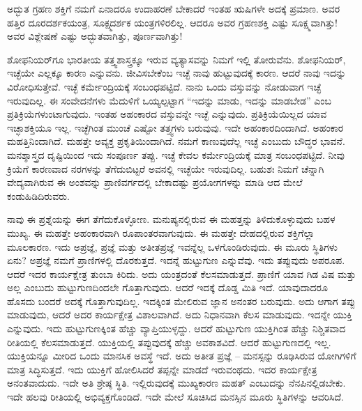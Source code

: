 ಅದ್ಭುತ ಗ್ರಹಣ ಶಕ್ತಿಗೆ ನಮಗೆ ಏನಾದರೂ ಉದಾಹರಣೆ ಬೇಕಾದರೆ ಇಂತಹ ಋಷಿಗಳೇ ಅದಕ್ಕೆ ಪ್ರಮಾಣ. ಅವರ ಹತ್ತಿರ ದೂರದರ್ಶಕಯಂತ್ರ, ಸೂಕ್ಷ್ಮದರ್ಶಕ ಯಂತ್ರಗಳಿರಲಿಲ್ಲ. ಆದರೂ ಅವರ ಗ್ರಹಣಶಕ್ತಿ ಎಷ್ಟು ಸೂಕ್ಷ್ಮವಾಗಿತ್ತು! ಅವರ ವಿಶ್ಲೇಷಣೆ ಎಷ್ಟು ಅದ್ಭುತವಾಗಿತ್ತು, ಪೂರ್ಣವಾಗಿತ್ತು!

ಶೋಫನಿಯರ್‌ಗೂ ಭಾರತೀಯ ತತ್ತ್ವಶಾಸ್ತ್ರಕ್ಕೂ ಇರುವ ವ್ಯತ್ಯಾಸವನ್ನು ನಿಮಗೆ ಇಲ್ಲಿ ತೋರುವೆನು. ಶೋಫನಿಯರ್, ಇಚ್ಛೆಯೇ ಎಲ್ಲಕ್ಕೂ ಕಾರಣ ಎನ್ನುವನು. ಜೀವಿಸಬೇಕೆಂಬ ಇಚ್ಛೆ ನಾವು ಹುಟ್ಟುವುದಕ್ಕೆ ಕಾರಣ. ಆದರೆ ನಾವು ಇದನ್ನು ವಿರೋಧಿಸುತ್ತೇವೆ. ಇಚ್ಛೆ ಕರ್ಮೇಂದ್ರಿಯಕ್ಕೆ ಸಂಬಂಧಪಟ್ಟಿದೆ. ನಾನು ಒಂದು ವಸ್ತುವನ್ನು ನೋಡುವಾಗ ಇಚ್ಛೆ ಇರುವುದಿಲ್ಲ. ಈ ಸಂವೇದನೆಗಳು ಮೆದುಳಿಗೆ ಒಯ್ಯಲ್ಪಟ್ಟಾಗ “ಇದನ್ನು ಮಾಡು, ಇದನ್ನು ಮಾಡಬೇಡ” ಎಂಬ ಪ್ರತಿಕ್ರಿಯೆಗಳುಂಟಾಗುವುದು. ಇಂತಹ ಅಹಂಕಾರದ ವಸ್ತುವನ್ನೇ ಇಚ್ಛೆ ಎನ್ನುವುದು. ಪ್ರತಿಕ್ರಿಯೆಯಿಲ್ಲದ ಯಾವ ಇಚ್ಛಾಶಕ್ತಿಯೂ ಇಲ್ಲ. ಇಚ್ಛೆಗಿಂತ ಮುಂಚೆ ಎಷ್ಟೋ ತತ್ತ್ವಗಳು ಬರುವುವು. ಇದೇ ಅಹಂಕಾರದಿಂದಾಗಿದೆ. ಅಹಂಕಾರ ಮಹತ್ತಿನಿಂದಾಗಿದೆ. ಮಹತ್ತೇ ಅವ್ಯಕ್ತ ಪ್ರಕೃತಿಯಿಂದಾಗಿದೆ. ನಮಗೆ ಕಾಣುವುದೆಲ್ಲ ಇಚ್ಛೆ ಎಂಬುದು ಬೌದ್ಧರ ಭಾವನೆ. ಮನಶ್ಶಾಸ್ತ್ರದ ದೃಷ್ಟಿಯಿಂದ ಇದು ಸಂಪೂರ್ಣ ತಪ್ಪು. ಇಚ್ಛೆ ಕೇವಲ ಕರ್ಮೇಂದ್ರಿಯಕ್ಕೆ ಮಾತ್ರ ಸಂಬಂಧಪಟ್ಟಿದೆ. ನೀವು ಕ್ರಿಯೆಗೆ ಕಾರಣವಾದ ನರಗಳನ್ನು ತೆಗೆದುಬಿಟ್ಟರೆ ಅವನಲ್ಲಿ ಇಚ್ಛೆಯೇ ಇರುವುದಿಲ್ಲ. ಬಹುಶಃ ನಿಮಗೆ ಚೆನ್ನಾಗಿ ವೇದ್ಯವಾಗಿರುವ ಈ ಅಂಶವನ್ನು ಪ್ರಾಣಿವರ್ಗದಲ್ಲಿ ಬೇಕಾದಷ್ಟು ಪ್ರಯೋಗಗಳನ್ನು ಮಾಡಿ ಆದ ಮೇಲೆ ಕಂಡುಹಿಡಿದಿರುವರು.

ನಾವು ಈ ಪ್ರಶ್ನೆಯನ್ನು ಈಗ ತೆಗೆದುಕೊಳ್ಳೋಣ. ಮನುಷ್ಯನಲ್ಲಿರುವ ಈ ಮಹತ್ತನ್ನು ತಿಳಿದುಕೊಳ್ಳುವುದು ಬಹಳ ಮುಖ್ಯ. ಈ ಮಹತ್ತೇ ಅಹಂಕಾರವಾಗಿ ರೂಪಾಂತರವಾಗುವುದು. ಈ ಮಹತ್ತೇ ದೇಹದಲ್ಲಿರುವ ಶಕ್ತಿಗೆಲ್ಲಾ ಮೂಲಕಾರಣ. ಇದು ಅಪ್ರಜ್ಞೆ, ಪ್ರಜ್ಞೆ ಮತ್ತು ಅತೀತಪ್ರಜ್ಞೆ ಇವನ್ನೆಲ್ಲ ಒಳಗೊಂಡಿರುವುದು. ಈ ಮೂರು ಸ್ಥಿತಿಗಳು ಏನು? ಅಪ್ರಜ್ಞೆ ನಮಗೆ ಪ್ರಾಣಿಗಳಲ್ಲಿ ದೊರಕುತ್ತದೆ. ಇದನ್ನೆ ಹುಟ್ಟುಗುಣ ಎನ್ನುವೆವು. ಇದು ತಪ್ಪುವುದು ಅಪರೂಪ. ಆದರೆ ಇದರ ಕಾರ್ಯಕ್ಷೇತ್ರ ತುಂಬಾ ಕಿರಿದು. ಅದು ಯಂತ್ರದಂತೆ ಕೆಲಸಮಾಡುತ್ತದೆ. ಪ್ರಾಣಿಗೆ ಯಾವ ಗಿಡ ವಿಷ ಮತ್ತು ಅಲ್ಲ ಎಂಬುದು ಹುಟ್ಟುಗುಣದಿಂದಲೇ ಗೊತ್ತಾಗುವುದು. ಆದರೆ ಇದಕ್ಕೆ ದೊಡ್ಡ ಮಿತಿ ಇದೆ. ಯಾವುದಾದರೂ ಹೊಸದು ಬಂದರೆ ಅದಕ್ಕೆ ಗೊತ್ತಾಗುವುದಿಲ್ಲ. ಇದಕ್ಕಿಂತ ಮೇಲಿರುವ ಜ್ಞಾನ ಅನಂತರ ಬರುವುದು. ಅದು ಆಗಾಗ ತಪ್ಪು ಮಾಡುವುದು, ಆದರೆ ಅದರ ಕಾರ್ಯಕ್ಷೇತ್ರ ವಿಶಾಲವಾಗಿದೆ. ಅದು ನಿಧಾನವಾಗಿ ಕೆಲಸ ಮಾಡುವುದು. ಇದನ್ನೇ ಯುಕ್ತಿ ಎನ್ನುವುದು. ಇದು ಹುಟ್ಟುಗುಣಕ್ಕಿಂತ ಹೆಚ್ಚು ವ್ಯಾಪ್ತಿಯುಳ್ಳದ್ದು. ಆದರೆ ಹುಟ್ಟುಗುಣ ಯುಕ್ತಿಗಿಂತ ಹೆಚ್ಚು ನಿಶ್ಚಿತವಾದ ರೀತಿಯಲ್ಲಿ ಕೆಲಸಮಾಡುತ್ತದೆ. ಯುಕ್ತಿಯಲ್ಲಿ ತಪ್ಪುವುದಕ್ಕೆ ಹೆಚ್ಚು ಅವಕಾಶವಿದೆ. ಆದರೆ ಹುಟ್ಟುಗುಣದಲ್ಲಿ ಇಲ್ಲ. ಯುಕ್ತಿಯನ್ನೂ ಮೀರಿದ ಒಂದು ಮಾನಸಿಕ ಅವಸ್ಥೆ ಇದೆ. ಅದು ಅತೀತ ಪ್ರಜ್ಞೆ – ಮನಸ್ಸನ್ನು ರೂಢಿಸಿರುವ ಯೋಗಿಗಳಿಗೆ ಮಾತ್ರ ಸಿದ್ಧಿಸುತ್ತದೆ. ಇದು ಯುಕ್ತಿಗೆ ಹೋಲಿಸಿದರೆ ತಪ್ಪನ್ನೇ ಮಾಡದೆ ಇರುವಂಥದು. ಇದರ ಕಾರ್ಯಕ್ಷೇತ್ರ ಅನಂತವಾದುದು. ಇದೇ ಅತಿ ಶ್ರೇಷ್ಠ ಸ್ಥಿತಿ. ಇಲ್ಲಿರುವುದಕ್ಕೆ ಮುಖ್ಯಕಾರಣ ಮಹತ್ ಎಂಬುದನ್ನು ನೆನಪಿನಲ್ಲಿಡಬೇಕು. ಇದೇ ಹಲವು ರೀತಿಯಲ್ಲಿ ಅಭಿವ್ಯಕ್ತಗೊಂಡಿದೆ. ಇದೇ ಮೇಲೆ ಸೂಚಿಸಿದ ಮನಸ್ಸಿನ ಮೂರು ಸ್ಥಿತಿಗಳನ್ನು ಆವರಿಸಿದೆ.

